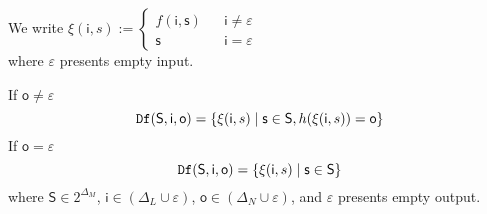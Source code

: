 We write $\xi(\mathsf{i}, s):= \left\{
\begin{array}{rcl}
f( \mathsf{i}, \mathsf{s})      &      & {\mathsf{i}\neq \varepsilon}\\
\mathsf{s}       &      & {\mathsf{i}= \varepsilon}
\end{array} \right. $\\
where $\varepsilon$ presents empty input.
\begin{definition}[$\Ded( \mathsf{S},  \mathsf{i},  \mathsf{o})$] 
If $\mathsf{o}\neq \varepsilon$
\begin{equation*}
 {\tt Df}( \mathsf{S},  \mathsf{i},  \mathsf{o})=\{  \xi(\mathsf{i}, s ) \mid  \mathsf{s} \in \mathsf{S},  h(\xi(\mathsf{i}, s ))=\mathsf{o}\}
\end{equation*}
If $\mathsf{o}= \varepsilon$
\begin{equation*}
{\tt Df}( \mathsf{S},  \mathsf{i},  \mathsf{o})=\{  \xi(\mathsf{i}, s ) \mid  \mathsf{s} \in \mathsf{S}\}
\end{equation*}
where $\mathsf{S}\in 2^{\Delta_M}$, $\mathsf{i} \in (\Delta_L\cup\varepsilon)$, $\mathsf{o} \in (\Delta_N\cup\varepsilon)$, and $\varepsilon$ presents empty output.
\end{definition}

